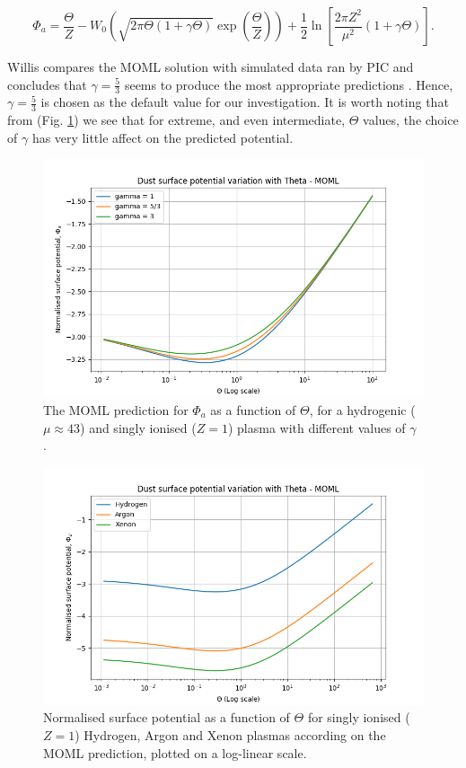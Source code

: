 \documentclass{article}
\begin{document}
\begin{equation}\label{eq:MOMLsol}
\Phi_a =  \frac{\Theta}{Z} - W_{0}\left(\sqrt{2\pi \Theta (1 + \gamma \Theta)} \exp{\left (\frac{\Theta}{Z}\right)}\right) + \frac{1}{2}\ln{\left[\frac{2\pi Z^2}{\mu^2}(1 + \gamma \Theta)\right]}.
\end{equation}

Willis compares the MOML solution with simulated data ran by PIC and concludes that 
$\gamma = \frac{5}{3}$ seems to produce the most appropriate predictions \cite{Willis}. 
Hence, $\gamma = \frac{5}{3}$ is chosen as the default value for our investigation. It is worth noting
that from (Fig. \ref{MOMLgamma}) we see that for extreme, and even intermediate, $\Theta$ values, 
the choice of $\gamma$ has very little affect on the predicted potential.

\begin{figure}[H]
\centering
\includegraphics[width=\linewidth]{Output/MOMLgamma.jpeg}
\caption{The MOML prediction for  $\Phi_a$ as a function of $\Theta$, for a hydrogenic ($\mu \approx 43$) and singly ionised ($Z = 1$) plasma with different values of $\gamma$ \cite{Thomas}.}
\label{MOMLgamma} 
\end{figure}

\begin{figure}[H]
\centering
\includegraphics[width=\linewidth]{Output/MOMLgraph.jpeg}
\caption{Normalised surface potential as a function of $\Theta$ for singly ionised ($Z = 1$) Hydrogen, Argon and Xenon plasmas according on the MOML prediction, plotted on a log-linear scale.}
\label{MOMLgraph} 
\end{figure}
    
\end{document}
